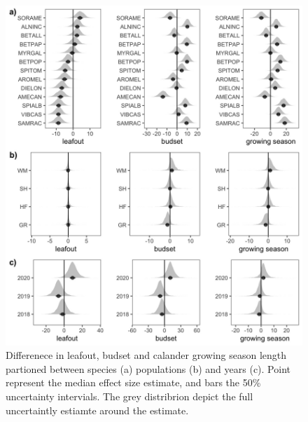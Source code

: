 \documentclass[12 pt]{article}
\begin{document}
\begin{figure}[h!]
    \centering
 \includegraphics[width=.7\textwidth]{..//analyses/figures/var_parts.jpeg}
    \caption{Differenece in leafout, budset and calander growing season length partioned between species (a) populations (b) and years (c). Point represent the median effect size estimate, and bars the 50\% uncertainty intervials. The grey distribrion depict the full uncertaintly estiamte around the estimate.}
    \label{fig:vapar}
\end{figure}
\end{document}
